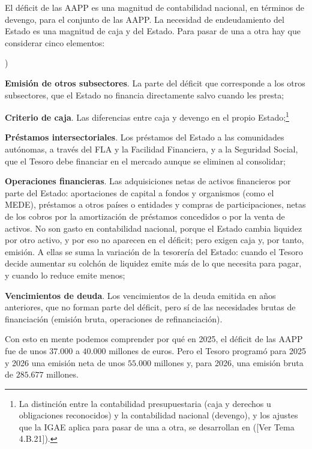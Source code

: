 \documentclass[10pt,a4paper]{article}
\newcounter{alphaitem}
\newenvironment{la}
      {\begin{list}{\alph{alphaitem})}{%
          \usecounter{alphaitem}%
          \setlength{\leftmargin}{1cm}%
          \setlength{\parskip}{3pt}%
          \setlength{\itemsep}{0pt}%
          \setlength{\parsep}{0pt}%
      }}
      {\end{list}}
\newcommand{\authorfont}[1]{{\fontfamily{EBGaramond-TLF}\selectfont #1}}
\begin{document}
El déficit de las AAPP es una magnitud de contabilidad nacional, en términos de devengo, para el conjunto de las AAPP. La necesidad de endeudamiento del Estado es una magnitud de caja y del Estado. Para pasar de una a otra hay que considerar cinco elementos:
\begin{la}
    \item \textbf{Emisión de otros subsectores}. La parte del déficit que corresponde a los otros subsectores, que el Estado no financia directamente salvo cuando les presta;
    \item \textbf{Criterio de caja}. Las diferencias entre caja y devengo en el propio Estado;\footnote{La distinción entre la contabilidad presupuestaria (caja y derechos u obligaciones reconocidos) y la contabilidad nacional (devengo), y los ajustes que la IGAE aplica para pasar de una a otra, se desarrollan en ([\authorfont{Ver Tema 4.B.21}]).
    }
    \item \textbf{Préstamos intersectoriales}. Los préstamos del Estado a las comunidades autónomas, a través del FLA y la Facilidad Financiera, y a la Seguridad Social, que el Tesoro debe financiar en el mercado aunque se eliminen al consolidar;
    \item \textbf{Operaciones financieras}. Las adquisiciones netas de activos financieros por parte del Estado: aportaciones de capital a fondos y organismos (como el MEDE), préstamos a otros países o entidades y compras de participaciones, netas de los cobros por la amortización de préstamos concedidos o por la venta de activos. No son gasto en contabilidad nacional, porque el Estado cambia liquidez por otro activo, y por eso no aparecen en el déficit; pero exigen caja y, por tanto, emisión. A ellas se suma la variación de la tesorería del Estado: cuando el Tesoro decide aumentar su colchón de liquidez emite más de lo que necesita para pagar, y cuando lo reduce emite menos;
    \item \textbf{Vencimientos de deuda}. Los vencimientos de la deuda emitida en años anteriores, que no forman parte del déficit, pero sí de las necesidades brutas de financiación (emisión bruta, operaciones de refinanciación).
\end{la}

Con esto en mente podemos comprender por qué en 2025, el déficit de las AAPP fue de unos $37.000$ a $40.000$ millones de euros. Pero el Tesoro programó para 2025 y 2026 una emisión neta de unos $55.000$ millones y, para 2026, una emisión bruta de $285.677$ millones. 
\end{document}
